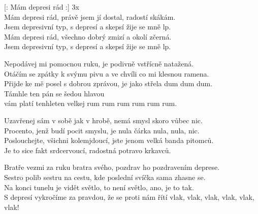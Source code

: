 
\re{}
[: Mám depresi rád :] 3x\\

\cho{}
Mám depresi rád, právě jsem jí dostal, radostí skákám.\\
Jsem depresivní typ, s depresí a skepsí žije se mně lp.\\
Mám depresi rád, všechno dobrý zmizí a okolí zčerná.\\
Jsem depresivní typ, s depresí a skepsí žije se mně lp.

\ve{}
Nepodávej mi pomocnou ruku, je podivně vstřícně natažená.\\
Otáčím se zpátky k svýmu pivu a ve chvíli co mi klesnou ramena.\\
Přijde ke mě posel s dobrou zprávou, je jako střela dum dum dum.\\
Támhle ten pán se šedou hlavou\\
vám platí tenhleten velkej rum rum rum rum rum rum.

\cho{}

\ve{}
Uzavřenej sám v sobě jak v hrobě,
nemá smysl skoro vůbec nic.\\
Procento, jenž budí pocit smyslu,
je nula čárka nula, nula, nic.\\
Poslouchejte, všichni kolemjdoucí,
jste jenom velká banda pitomců.\\
Je to sice fakt srdcervoucí,
radostná potravo krkavců.

\cho{}

\ve{}
Bratře vezmi za ruku bratra svého,
pozdrav ho pozdravením deprese.\\
Sestro polib sestru na cestu,
kde poslední svíčka sama zhasne se.\\
Na konci tunelu je vidět světlo,
to není světlo, ano, je to tak.\\
S depresí vykročíme za pravdou,
že se proti nám řítí vlak, vlak, vlak, vlak, vlak, vlak!

\cho{}

\esong{}